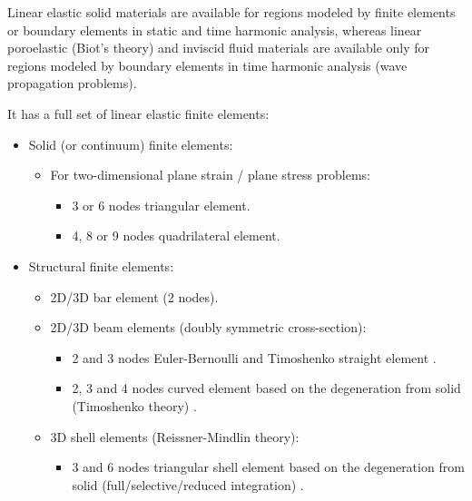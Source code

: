 \documentclass[a4paper,fleqn]{book}
\begin{document}
Linear elastic solid materials are available for regions modeled by finite elements or boundary elements in static and time harmonic analysis, whereas linear poroelastic (Biot's theory) and inviscid fluid materials are available only for regions modeled by boundary elements in time harmonic analysis (wave propagation problems).

It has a full set of linear elastic finite elements: 
\begin{itemize}
    \item Solid (or continuum) finite elements:
    \begin{itemize}
        \item For two-dimensional plane strain / plane stress problems:
        \begin{itemize}
            \item 3 or 6 nodes triangular element.
            \item 4, 8 or 9 nodes quadrilateral element.
        \end{itemize}
    \end{itemize}
    \item Structural finite elements:
    \begin{itemize}
        \item 2D/3D bar element (2 nodes).
        \item 2D/3D beam elements (doubly symmetric cross-section):
        \begin{itemize}
            \item 2 and 3 nodes Euler-Bernoulli and Timoshenko straight element \cite{onate2013,friedman1993}.
            \item 2, 3 and 4 nodes curved element based on the degeneration from solid (Timoshenko theory) \cite{bathe1996}.
        \end{itemize}
        \item 3D shell elements (Reissner-Mindlin theory):
        \begin{itemize}
            \item 3 and 6 nodes triangular shell element based on the degeneration from solid (full/selective/reduced integration) \cite{onate2013}.

\end{itemize}
\end{itemize}
\end{itemize}
\end{document}
